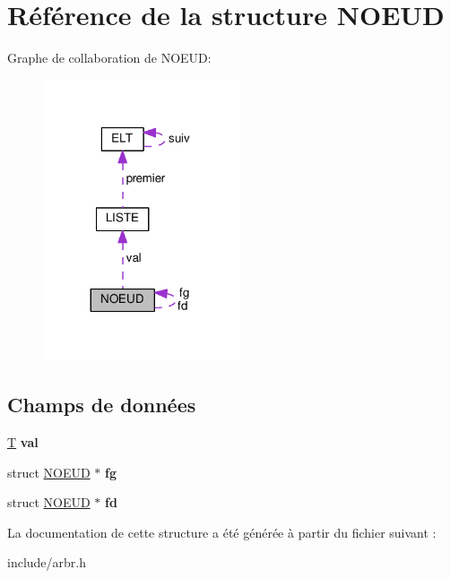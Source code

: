 \hypertarget{structNOEUD}{}\section{Référence de la structure N\+O\+E\+UD}
\label{structNOEUD}


Graphe de collaboration de N\+O\+E\+UD\+:
\nopagebreak
\begin{figure}[H]
\begin{center}
\leavevmode
\includegraphics[width=164pt]{structNOEUD__coll__graph}
\end{center}
\end{figure}
\subsection*{Champs de données}
\begin{DoxyCompactItemize}
\item 
\hyperlink{structLISTE}{T} {\bfseries val}\hypertarget{structNOEUD_a028a6db155a103060682adbecd1d096b}{}\label{structNOEUD_a028a6db155a103060682adbecd1d096b}

\item 
struct \hyperlink{structNOEUD}{N\+O\+E\+UD} $\ast$ {\bfseries fg}\hypertarget{structNOEUD_a051a743170965d9dfe5fa55b6c883f9a}{}\label{structNOEUD_a051a743170965d9dfe5fa55b6c883f9a}

\item 
struct \hyperlink{structNOEUD}{N\+O\+E\+UD} $\ast$ {\bfseries fd}\hypertarget{structNOEUD_aa4c90a057bed56b598c16a5d9a12809e}{}\label{structNOEUD_aa4c90a057bed56b598c16a5d9a12809e}

\end{DoxyCompactItemize}


La documentation de cette structure a été générée à partir du fichier suivant \+:\begin{DoxyCompactItemize}
\item 
include/arbr.\+h\end{DoxyCompactItemize}
